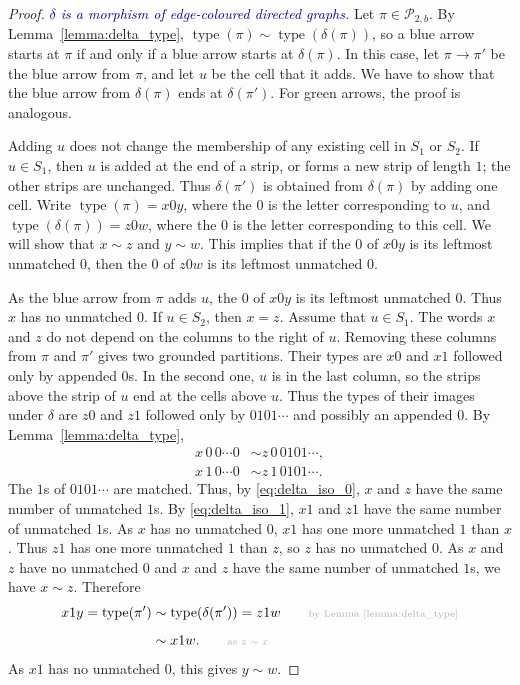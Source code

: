 \documentclass[11pt]{article}
\theoremstyle{definition}
\theoremstyle{remark}
\theoremstyle{definition}
\numberwithin{equation}{section}
\newcommand{\type}{\operatorname{type}}
\renewcommand\emph[1]{\textcolor{darkblue}{\it #1}}
\begin{document}
\begin{proof}
\emph{$\delta$ is a morphism of edge-coloured directed graphs.} Let $\pi\in\mathcal{P}_{2,b}$. By Lemma~\ref{lemma:delta_type}, $\type(\pi)\sim\type(\delta(\pi))$, so a blue arrow starts at $\pi$ if and only if a blue arrow starts at $\delta(\pi)$. In this case, let $\pi\to\pi'$ be the blue arrow from $\pi$, and let $u$ be the cell that it adds. We have to show that the blue arrow from $\delta(\pi)$ ends at $\delta(\pi')$. For green arrows, the proof is analogous.

Adding $u$ does not change the membership of any existing cell in $S_1$ or $S_2$. If $u\in S_1$, then $u$ is added at the end of a strip, or forms a new strip of length $1$; the other strips are unchanged. Thus $\delta(\pi')$ is obtained from $\delta(\pi)$ by adding one cell. Write $\type(\pi)=x0y$, where the $0$ is the letter corresponding to $u$, and $\type(\delta(\pi))=z0w$, where the $0$ is the letter corresponding to this cell. We will show that $x\sim z$ and $y\sim w$. This implies that if the $0$ of $x0y$ is its leftmost unmatched $0$, then the $0$ of $z0w$ is its leftmost unmatched $0$.

As the blue arrow from $\pi$ adds $u$, the $0$ of $x0y$ is its leftmost unmatched $0$. Thus $x$ has no unmatched $0$. If $u\in S_2$, then $x=z$. Assume that $u\in S_1$. The words $x$ and $z$ do not depend on the columns to the right of $u$. Removing these columns from $\pi$ and $\pi'$ gives two grounded partitions. Their types are $x0$ and $x1$ followed only by appended $0$s. In the second one, $u$ is in the last column, so the strips above the strip of $u$ end at the cells above $u$. Thus the types of their images under $\delta$ are $z0$ and $z1$ followed only by $0101\cdots$ and possibly an appended $0$. By Lemma~\ref{lemma:delta_type},
\begin{align}
x\,0\,0\cdots0&\sim z\,0\,0101\cdots,\label{eq:delta_iso_0}\\
x\,1\,0\cdots0&\sim z\,1\,0101\cdots.\label{eq:delta_iso_1}
\end{align}
The $1$s of $0101\cdots$ are matched. Thus, by \eqref{eq:delta_iso_0}, $x$ and $z$ have the same number of unmatched $1$s. By \eqref{eq:delta_iso_1}, $x1$ and $z1$ have the same number of unmatched $1$s. As $x$ has no unmatched $0$, $x1$ has one more unmatched $1$ than $x$. Thus $z1$ has one more unmatched $1$ than $z$, so $z$ has no unmatched $0$. As $x$ and $z$ have no unmatched $0$ and $x$ and $z$ have the same number of unmatched $1$s, we have $x\sim z$. Therefore
\begin{align}
x1y=\type(\pi')
&\sim\type(\delta(\pi'))=z1w
\qquad{\scriptstyle\textcolor{gray!60}{\text{by Lemma~\ref{lemma:delta_type}}}}\\[0.5em]
&\sim x1w.
\qquad{\scriptstyle\textcolor{gray!60}{\text{as $z\sim x$}}}
\end{align}
As $x1$ has no unmatched $0$, this gives $y\sim w$.


\end{proof}
\end{document}
